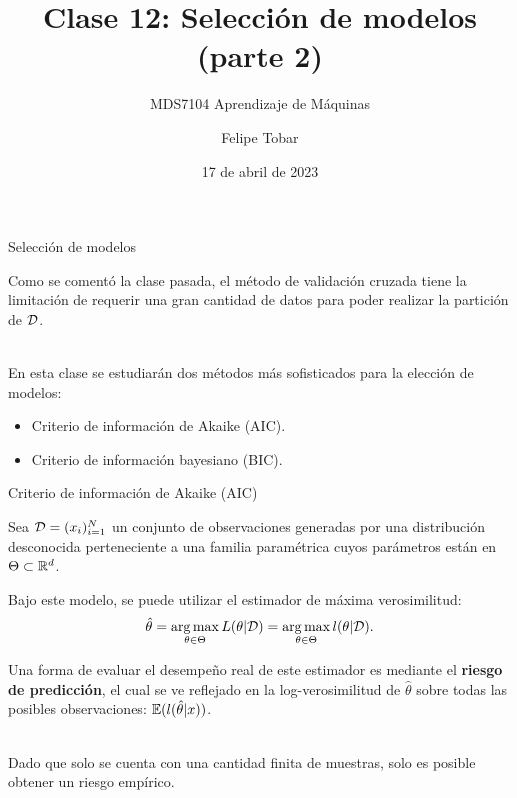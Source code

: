\documentclass[handout, 9pt]{beamer}
\title{Clase 12: Selección de modelos (parte 2)}
\subtitle{MDS7104 Aprendizaje de Máquinas}
\date{17 de abril de 2023}
\author{Felipe Tobar}
\institute{Iniciativa de Datos e Inteligencia Artificial\\Universidad de Chile}
\begin{document}
\begin{frame}
  \titlepage
\end{frame}

\begin{frame}{Selección de modelos}

Como se comentó la clase pasada, el método de validación cruzada tiene la limitación de requerir una gran cantidad de datos para poder realizar la partición de ${\mathcal D}$.\\~\ \pause

En esta clase se estudiarán dos métodos más sofisticados para la elección de modelos:

\begin{itemize}
	\item Criterio de información de Akaike (AIC).
	\item Criterio de información bayesiano (BIC).
\end{itemize}
	
\end{frame}


\begin{frame}{Criterio de información de Akaike (AIC)}

Sea ${\mathcal D}=(x_i)_{i=1}^N$ un conjunto de observaciones generadas por una distribución desconocida perteneciente a una familia paramétrica cuyos parámetros están en $\Theta\subset\mathbb{R}^d$.\\ \pause

Bajo este modelo, se puede utilizar el estimador de máxima verosimilitud:
\begin{equation*}
	\hat{\theta} = \operatorname*{arg\,max}_{\theta\in\Theta} L(\theta|{\mathcal D}) =  \operatorname*{arg\,max}_{\theta\in\Theta} l(\theta|{\mathcal D}).
\end{equation*}

Una forma de evaluar el desempeño real de este estimador es mediante el \textbf{riesgo de predicción}, el cual se ve reflejado en la log-verosimilitud de $\hat{\theta}$ sobre todas las posibles observaciones: $\operatorname{\mathbb{E}}(l(\hat{\theta}|x))$.\\~\ \pause

Dado que solo se cuenta con una cantidad finita de muestras, solo es posible obtener un riesgo empírico.\\

\end{frame}
\end{document}
